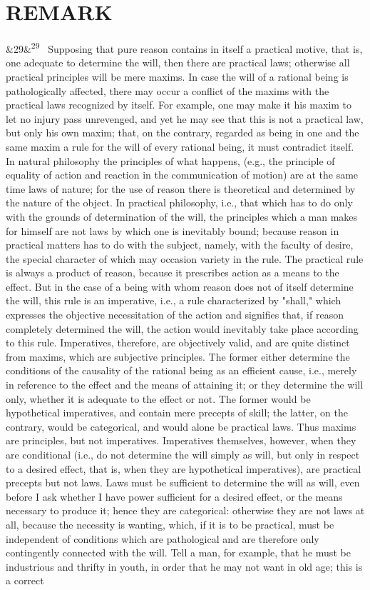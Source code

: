 \documentclass[12pt]{article}
\newcommand{\para}[1][]{\par\noindent\ifx&#1&\else\textsuperscript{\footnotesize #1}~\fi}
\begin{document}
\section*{REMARK}

\para[29] Supposing that pure reason contains in itself a practical motive, that is, one adequate to determine the will, then there are practical laws; otherwise all practical principles will be mere maxims. In case the will of a rational being is pathologically affected, there may occur a conflict of the maxims with the practical laws recognized by itself. For example, one may make it his maxim to let no injury pass unrevenged, and yet he may see that this is not a practical law, but only his own maxim; that, on the contrary, regarded as being in one and the same maxim a rule for the will of every rational being, it must contradict itself. In natural philosophy the principles of what happens, (e.g., the principle of equality of action and reaction in the communication of motion) are at the same time laws of nature; for the use of reason there is theoretical and determined by the nature of the object. In practical philosophy, i.e., that which has to do only with the grounds of determination of the will, the principles which a man makes for himself are not laws by which one is inevitably bound; because reason in practical matters has to do with the subject, namely, with the faculty of desire, the special character of which may occasion variety in the rule. The practical rule is always a product of reason, because it prescribes action as a means to the effect. But in the case of a being with whom reason does not of itself determine the will, this rule is an imperative, i.e., a rule characterized by "shall," which expresses the objective necessitation of the action and signifies that, if reason completely determined the will, the action would inevitably take place according to this rule. Imperatives, therefore, are objectively valid, and are quite distinct from maxims, which are subjective principles. The former either determine the conditions of the causality of the rational being as an efficient cause, i.e., merely in reference to the effect and the means of attaining it; or they determine the will only, whether it is adequate to the effect or not. The former would be hypothetical imperatives, and contain mere precepts of skill; the latter, on the contrary, would be categorical, and would alone be practical laws. Thus maxims are principles, but not imperatives. Imperatives themselves, however, when they are conditional (i.e., do not determine the will simply as will, but only in respect to a desired effect, that is, when they are hypothetical imperatives), are practical precepts but not laws. Laws must be sufficient to determine the will as will, even before I ask whether I have power sufficient for a desired effect, or the means necessary to produce it; hence they are categorical: otherwise they are not laws at all, because the necessity is wanting, which, if it is to be practical, must be independent of conditions which are pathological and are therefore only contingently connected with the will. Tell a man, for example, that he must be industrious and thrifty in youth, in order that he may not want in old age; this is a correct 
\end{document}

